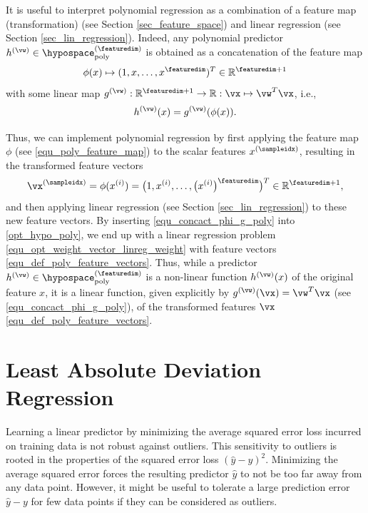 \documentclass[12pt]{report}
\begin{document}
It is useful to interpret polynomial regression as a combination of a feature map (transformation) 
(see Section \ref{sec_feature_space}) and linear regression (see Section \ref{sec_lin_regression}). 
Indeed, any polynomial predictor $h^{(\vw)} \in \hypospace_{\rm poly}^{(\featuredim)}$ is obtained as 
a concatenation of the feature map  
\begin{equation}
\label{equ_poly_feature_map} 
\phi(x) \mapsto (1,x,\ldots,x^{\featuredim})^{T} \in \mathbb{R}^{\featuredim+1}
\end{equation}
with some linear map $g^{(\vw)}: \mathbb{R}^{\featuredim+1} \rightarrow \mathbb{R}: \vx \mapsto \vw^{T} \vx$, i.e., 
\begin{equation}
\label{equ_concact_phi_g_poly}
h^{(\vw)}(x) = g^{(\vw)}(\phi(x)). 
\end{equation}

Thus, we can implement polynomial regression by first applying the feature map $\phi$ (see \eqref{equ_poly_feature_map}) 
to the scalar features $x^{(\sampleidx)}$, resulting in the transformed feature vectors 
\begin{equation} 
\label{equ_def_poly_feature_vectors}
\vx^{(\sampleidx)} = \phi(x^{(i)}) = \big(1,x^{(i)},\ldots,\big( x^{(i)} \big)^{\featuredim} \big)^{T} \in \mathbb{R}^{\featuredim+1}, 
\end{equation} 
and then applying linear regression  (see Section \ref{sec_lin_regression}) 
to these new feature vectors. By inserting \eqref{equ_concact_phi_g_poly} 
into \eqref{opt_hypo_poly}, we end up with a linear regression problem 
\eqref{equ_opt_weight_vector_linreg_weight} with feature vectors \eqref{equ_def_poly_feature_vectors}. 
Thus, while a predictor $h^{(\vw)} \in \hypospace_{\rm poly}^{(\featuredim)}$ 
is a non-linear function $h^{(\vw)}(x)$ of the original feature $x$, it is a linear 
function, given explicitly by $g^{(\vw)}(\vx) = \vw^{T}\vx$ (see \eqref{equ_concact_phi_g_poly}), 
of the transformed features $\vx$ \eqref{equ_def_poly_feature_vectors}. 

\section{Least Absolute Deviation Regression}
\label{sec_lad}

Learning a linear predictor by minimizing the average squared error loss incurred 
on training data is not robust against outliers. This sensitivity to outliers is rooted 
in the properties of the squared error loss $(\hat{y} - y)^{2}$. Minimizing the 
average squared error forces the resulting predictor $\hat{y}$ to not be too far 
away from any data point. However, it might be useful to tolerate a large prediction 
error $\hat{y}-y$ for few data points if they can be considered as outliers. 
\end{document}
